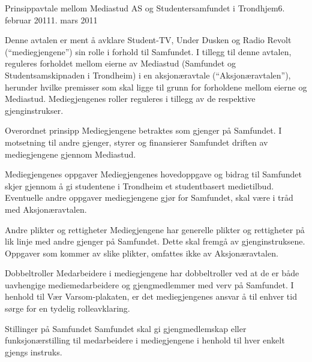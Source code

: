 \documentclass[../fsbok.tex]{subfiles}
\begin{document}
\begin{instruks}{Prinsippavtale mellom Mediastud AS og Studentersamfundet i Trondhjem}{6. februar 2011}{1. mars 2011}


    Denne avtalen er ment å avklare Student-TV, Under Dusken og Radio Revolt
    (``mediegjengene'') sin rolle i forhold til Samfundet. I tillegg til denne avtalen, reguleres forholdet mellom
    eierne av Mediastud (Samfundet og Studentsamskipnaden i Trondheim) i en aksjonæravtale
    (``Aksjonæravtalen''), herunder hvilke premisser som skal ligge til grunn for forholdene mellom
    eierne og Mediastud. Mediegjengenes roller reguleres i tillegg av de respektive gjenginstrukser.


    \begin{instruksledd}{Overordnet prinsipp}
        Mediegjengene betraktes som gjenger på Samfundet. I motsetning til andre gjenger,
        styrer og finansierer Samfundet driften av mediegjengene gjennom Mediastud.  
    \end{instruksledd}

    \begin{instruksledd}{Mediegjengenes oppgaver}
        Mediegjengenes hovedoppgave og bidrag til Samfundet skjer gjennom å gi studentene i
        Trondheim et studentbasert medietilbud. Eventuelle andre oppgaver mediegjengene gjør for
        Samfundet, skal være i tråd med Aksjonæravtalen.  
    \end{instruksledd}        

    \begin{instruksledd}{Andre plikter og rettigheter}
        Mediegjengene har generelle plikter og rettigheter på lik linje med andre gjenger på
        Samfundet.  Dette skal fremgå av gjenginstruksene. Oppgaver som kommer av slike plikter, omfattes ikke
        av Aksjonæravtalen.  
    \end{instruksledd}

    \begin{instruksledd}{Dobbeltroller}
        Medarbeidere i mediegjengene har dobbeltroller ved at de er både uavhengige
        mediemedarbeidere
        og gjengmedlemmer med verv på Samfundet. I henhold til Vær Varsom-plakaten, er det
        mediegjengenes ansvar å til enhver tid sørge for en tydelig rolleavklaring.
    \end{instruksledd}


    \begin{instruksledd}{Stillinger på Samfundet}
        Samfundet skal gi gjengmedlemskap eller funksjonærstilling til medarbeidere i
        mediegjengene i henhold til hver enkelt gjengs instruks.
    \end{instruksledd}



\end{instruks}
\end{document}
